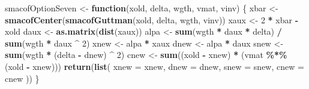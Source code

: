 \documentclass[
  12pt,
]{article}
\newenvironment{Shaded}{\begin{snugshade}}{\end{snugshade}}
\newcommand{\AttributeTok}[1]{\textcolor[rgb]{0.13,0.29,0.53}{#1}}
\newcommand{\ControlFlowTok}[1]{\textcolor[rgb]{0.13,0.29,0.53}{\textbf{#1}}}
\newcommand{\DecValTok}[1]{\textcolor[rgb]{0.00,0.00,0.81}{#1}}
\newcommand{\FunctionTok}[1]{\textcolor[rgb]{0.13,0.29,0.53}{\textbf{#1}}}
\newcommand{\NormalTok}[1]{#1}
\newcommand{\OtherTok}[1]{\textcolor[rgb]{0.56,0.35,0.01}{#1}}
\newcommand{\SpecialCharTok}[1]{\textcolor[rgb]{0.81,0.36,0.00}{\textbf{#1}}}
\begin{document}
\begin{Shaded}
\begin{Highlighting}[]
\NormalTok{smacofOptionSeven }\OtherTok{\textless{}{-}} \ControlFlowTok{function}\NormalTok{(xold, delta, wgth, vmat, vinv) \{}
\NormalTok{  xbar }\OtherTok{\textless{}{-}} \FunctionTok{smacofCenter}\NormalTok{(}\FunctionTok{smacofGuttman}\NormalTok{(xold, delta, wgth, vinv))}
\NormalTok{  xaux }\OtherTok{\textless{}{-}} \DecValTok{2} \SpecialCharTok{*}\NormalTok{ xbar }\SpecialCharTok{{-}}\NormalTok{ xold}
\NormalTok{  daux }\OtherTok{\textless{}{-}} \FunctionTok{as.matrix}\NormalTok{(}\FunctionTok{dist}\NormalTok{(xaux))}
\NormalTok{  alpa }\OtherTok{\textless{}{-}} \FunctionTok{sum}\NormalTok{(wgth }\SpecialCharTok{*}\NormalTok{ daux }\SpecialCharTok{*}\NormalTok{ delta) }\SpecialCharTok{/} \FunctionTok{sum}\NormalTok{(wgth }\SpecialCharTok{*}\NormalTok{ daux }\SpecialCharTok{\^{}} \DecValTok{2}\NormalTok{)}
\NormalTok{  xnew }\OtherTok{\textless{}{-}}\NormalTok{ alpa }\SpecialCharTok{*}\NormalTok{ xaux}
\NormalTok{  dnew }\OtherTok{\textless{}{-}}\NormalTok{ alpa }\SpecialCharTok{*}\NormalTok{ daux}
\NormalTok{  snew }\OtherTok{\textless{}{-}} \FunctionTok{sum}\NormalTok{(wgth }\SpecialCharTok{*}\NormalTok{ (delta }\SpecialCharTok{{-}}\NormalTok{ dnew) }\SpecialCharTok{\^{}} \DecValTok{2}\NormalTok{)}
\NormalTok{  cnew }\OtherTok{\textless{}{-}} \FunctionTok{sum}\NormalTok{((xold }\SpecialCharTok{{-}}\NormalTok{ xnew) }\SpecialCharTok{*}\NormalTok{ (vmat }\SpecialCharTok{\%*\%}\NormalTok{ (xold }\SpecialCharTok{{-}}\NormalTok{ xnew)))}
  \FunctionTok{return}\NormalTok{(}\FunctionTok{list}\NormalTok{(}
    \AttributeTok{xnew =}\NormalTok{ xnew,}
    \AttributeTok{dnew =}\NormalTok{ dnew,}
    \AttributeTok{snew =}\NormalTok{ snew,}
    \AttributeTok{cnew =}\NormalTok{ cnew}
\NormalTok{  ))}
\NormalTok{\}}


\end{Highlighting}
\end{Shaded}
\end{document}
